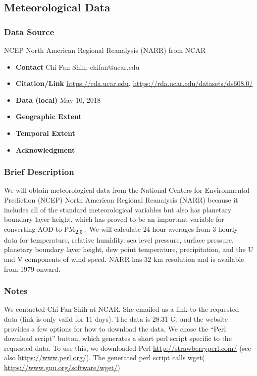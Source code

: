 \subsection{Meteorological Data}
\subsubsection*{Data Source} NCEP North American Regional Reanalysis (NARR) from NCAR
\begin{itemize}[nolistsep]
\item \textbf{Contact} Chi-Fan Shih, chifan@ucar.edu
\item \textbf{Citation/Link} \url{https://rda.ucar.edu}, \url{https://rda.ucar.edu/datasets/ds608.0/}
\item \textbf{Data (local)} May 10, 2018
\item \textbf{Geographic Extent}
\item \textbf{Temporal Extent}
\item \textbf{Acknowledgment}
\end{itemize}
\subsubsection*{Brief Description}

We will obtain meteorological data from the National Centers for Environmental Prediction (NCEP) North American Regional Reanalysis (NARR) \citep{Mesinger2006,NCEPReanalysis2005} because it includes all of the standard meteorological variables but also has planetary boundary layer height, which has proved to be an important variable for converting AOD to PM\textsubscript{2.5} \citep{liu_estimating_2005}. We will calculate 24-hour averages from 3-hourly data for temperature, relative humidity, sea level pressure, surface pressure, planetary boundary layer height, dew point temperature, precipitation, and the U and V components of wind speed. NARR has 32 km resolution and is available from 1979 onward. 

\subsubsection*{Notes}

We contacted Chi-Fan Shih at NCAR. She emailed us a link to the requested data (link is only valid for 11 days). The data is 28.31 G, and the website provides a few options for how to download the data. We chose the ``Perl download script'' button, which generates a short perl script specific to the requested data. To use this, we downloaded Perl \url{http://strawberryperl.com/} (see also \url{https://www.perl.org/}). The generated perl script calls wget( \url{https://www.gnu.org/software/wget/})



